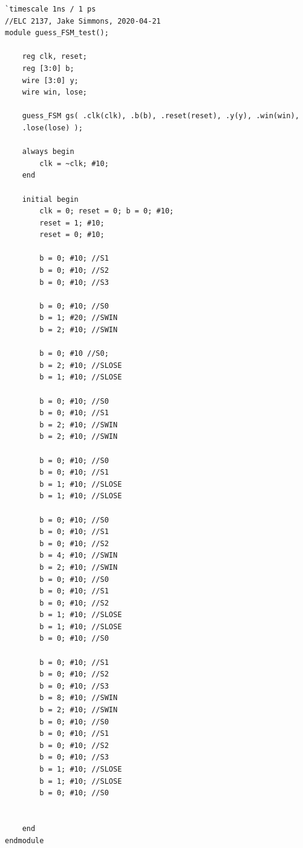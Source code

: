 \documentclass[11pt]{article}
\begin{document}
\begin{lstlisting}[style=Verilog,
caption=guess FSM Test Bench,
label=guess_FSM_test
]
`timescale 1ns / 1 ps
//ELC 2137, Jake Simmons, 2020-04-21
module guess_FSM_test();

	reg clk, reset;
	reg [3:0] b;
	wire [3:0] y;
	wire win, lose;

	guess_FSM gs( .clk(clk), .b(b), .reset(reset), .y(y), .win(win),
	.lose(lose) );

	always begin
		clk = ~clk; #10;
	end

	initial begin
		clk = 0; reset = 0; b = 0; #10;
		reset = 1; #10;
		reset = 0; #10;

		b = 0; #10; //S1
		b = 0; #10; //S2
		b = 0; #10; //S3

		b = 0; #10; //S0
		b = 1; #20; //SWIN
		b = 2; #10; //SWIN

		b = 0; #10 //S0;
		b = 2; #10; //SLOSE
		b = 1; #10; //SLOSE

		b = 0; #10; //S0
		b = 0; #10; //S1
		b = 2; #10; //SWIN
		b = 2; #10; //SWIN

		b = 0; #10; //S0
		b = 0; #10; //S1
		b = 1; #10; //SLOSE
		b = 1; #10; //SLOSE

		b = 0; #10; //S0
		b = 0; #10; //S1
		b = 0; #10; //S2
		b = 4; #10; //SWIN
		b = 2; #10; //SWIN
		b = 0; #10; //S0
		b = 0; #10; //S1
		b = 0; #10; //S2
		b = 1; #10; //SLOSE
		b = 1; #10; //SLOSE
		b = 0; #10; //S0

		b = 0; #10; //S1
		b = 0; #10; //S2
		b = 0; #10; //S3
		b = 8; #10; //SWIN
		b = 2; #10; //SWIN
		b = 0; #10; //S0
		b = 0; #10; //S1
		b = 0; #10; //S2
		b = 0; #10; //S3
		b = 1; #10; //SLOSE
		b = 1; #10; //SLOSE
		b = 0; #10; //S0


	end
endmodule

\end{lstlisting}
\end{document}
